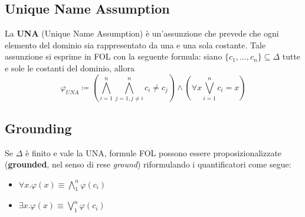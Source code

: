\subsection{Unique Name Assumption}

La \textbf{UNA} (Unique Name Assumption) è un'assunzione che prevede che ogni elemento del dominio sia rappresentato da una e una sola costante. Tale assunzione si esprime in FOL con la seguente formula: siano $\lbrace c_1, ..., c_n \rbrace \subseteq \Delta$ tutte e sole le costanti del dominio, allora
$$ \varphi_{UNA} \coloneqq (\bigwedge\limits_{i=1}^n \bigwedge\limits_{j=1,j\neq i}^n c_i \neq c_j) \land (\forall x \bigvee\limits_{i = 1}^n c_i = x)$$

\subsection{Grounding}

Se $\Delta$ è finito e vale la UNA, formule FOL possono essere proposizionalizzate (\textbf{grounded}, nel senso di rese \textit{ground}) riformulando i quantificatori come segue:
\begin{itemize}
\item $\forall x . \varphi(x) \equiv \bigwedge\limits_1^n  \varphi(c_i) $
\item $\exists x . \varphi(x) \equiv \bigvee\limits_1^n  \varphi(c_i) $
\end{itemize}
